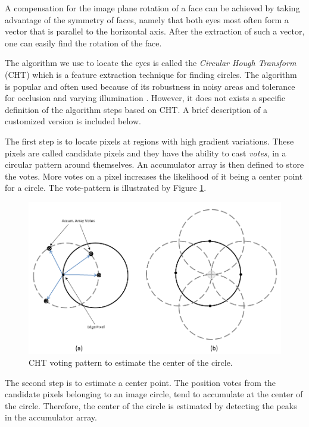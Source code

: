 A compensation for the image plane rotation of a face can be achieved by taking advantage of the symmetry of faces, namely that both eyes most often form a vector that is parallel to the horizontal axis. After the extraction of such a vector, one can easily find the rotation of the face.

The algorithm we use to locate the eyes is called the \textit{Circular Hough Transform} (CHT) which is a feature extraction technique for finding circles. The algorithm is popular and often used because of its robustness in noisy areas and tolerance for occlusion and varying illumination \cite{cht}. However, it does not exists a specific definition of the algorithm steps based on CHT. A brief description of a customized version is included below.



The first step is to locate pixels at regions with high gradient variations. These pixels are called candidate pixels and they have the ability to cast \textit{votes}, in a circular pattern around themselves. An accumulator array is then defined to store the votes. More votes on a pixel increases the likelihood of it being a center point for a circle. The vote-pattern is illustrated by Figure \ref{fig:CHT}.

\begin{figure}[H]
\includegraphics[scale=0.4]{img/fd/accarray.png}
\caption{CHT voting pattern to estimate the center of the circle.}
\label{fig:CHT}
\end{figure}

The second step is to estimate a center point. The position votes from the candidate pixels belonging to an image circle, tend to accumulate at the center of the circle. Therefore, the center of the circle is estimated by detecting the peaks in the accumulator array.


